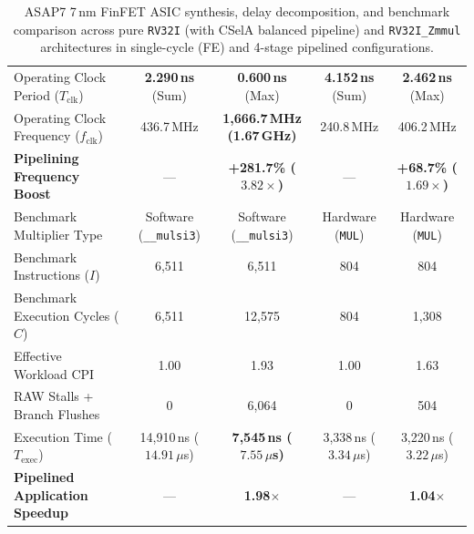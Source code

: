 \begin{table}[htbp]
\begin{tabular}{|l|c|c|c|c|}
\hline
Operating Clock Period ($T_{\text{clk}}$)       & \textbf{2.290\,ns} (Sum) & \textbf{0.600\,ns} (Max) & \textbf{4.152\,ns} (Sum) & \textbf{2.462\,ns} (Max) \\
Operating Clock Frequency ($f_{\text{clk}}$)    & 436.7\,MHz         & \textbf{1,666.7\,MHz (1.67\,GHz)} & 240.8\,MHz         & 406.2\,MHz \\
\textbf{Pipelining Frequency Boost}             & ---                & \textbf{+281.7\% ($3.82\times$)} & --- & \textbf{+68.7\% ($1.69\times$)} \\
\hline
Benchmark Multiplier Type       & Software (\texttt{\_\_mulsi3}) & Software (\texttt{\_\_mulsi3}) & Hardware (\texttt{MUL}) & Hardware (\texttt{MUL}) \\
Benchmark Instructions ($I$)    & 6,511            & 6,511            & 804              & 804 \\
Benchmark Execution Cycles ($C$)& 6,511            & 12,575           & 804              & 1,308 \\
Effective Workload CPI          & 1.00             & 1.93             & 1.00             & 1.63 \\
RAW Stalls + Branch Flushes     & 0                & 6,064            & 0                & 504 \\
\hline
Execution Time ($T_{\text{exec}}$) & 14,910\,ns ($14.91\,\mu$s) & \textbf{7,545\,ns ($7.55\,\mu$s)} & 3,338\,ns ($3.34\,\mu$s) & 3,220\,ns ($3.22\,\mu$s) \\
\textbf{Pipelined Application Speedup}      & ---         & \textbf{1.98$\times$} & ---         & \textbf{1.04$\times$} \\
\hline
\end{tabular}
\caption{ASAP7 7\,nm FinFET ASIC synthesis, delay decomposition, and benchmark comparison across pure \texttt{RV32I} (with CSelA balanced pipeline) and \texttt{RV32I\_Zmmul} architectures in single-cycle (FE) and 4-stage pipelined configurations.}\label{tab:riscv_grand_comparison}
\end{table}

